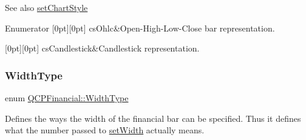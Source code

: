 \begin{DoxySeeAlso}{See also}
\mbox{\hyperlink{class_q_c_p_financial_a5a59175d36279d71596e64d7bb65596f}{set\+Chart\+Style}} 
\end{DoxySeeAlso}
\begin{DoxyEnumFields}{Enumerator}
[0pt][0pt]{}\mbox{\label{class_q_c_p_financial_a0f800e21ee98d646dfc6f8f89d10ebfba3a516016c9298d3e95dd82aa203c4390}} 
cs\+Ohlc&Open-\/\+High-\/\+Low-\/\+Close bar representation. \\
\hline

[0pt][0pt]{}\mbox{\label{class_q_c_p_financial_a0f800e21ee98d646dfc6f8f89d10ebfbac803cbd39f26e3f206bcc7028679e62f}} 
cs\+Candlestick&Candlestick representation. \\
\hline

\end{DoxyEnumFields}
\mbox{\label{class_q_c_p_financial_aef1761dda71a53dc5269685e9e492626}} 
\subsubsection{\texorpdfstring{WidthType}{WidthType}}
{\footnotesize\ttfamily enum \mbox{\hyperlink{class_q_c_p_financial_aef1761dda71a53dc5269685e9e492626}{Q\+C\+P\+Financial\+::\+Width\+Type}}}

Defines the ways the width of the financial bar can be specified. Thus it defines what the number passed to \mbox{\hyperlink{class_q_c_p_financial_a99633f8bac86a61d534ae5eeb1a3068f}{set\+Width}} actually means.

